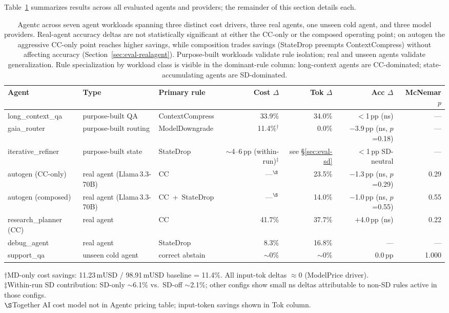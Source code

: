\documentclass[sigconf,9pt]{acmart}
\begin{document}
Table~\ref{tab:summary} summarizes results across all evaluated agents and providers;
the remainder of this section details each.

\begin{table}[t]
\caption{Agentc across seven agent workloads spanning three distinct cost drivers,
three real agents, one unseen cold agent, and three model providers.
Real-agent accuracy deltas are not statistically significant at either the CC-only or
the composed operating point; on autogen the aggressive CC-only point reaches higher
savings, while composition trades savings (StateDrop preempts ContextCompress) without
affecting accuracy (Section~\ref{sec:eval-realagent}).
Purpose-built workloads validate rule isolation;
real and unseen agents validate generalization. Rule specialization by workload class
is visible in the dominant-rule column: long-context agents are CC-dominated;
state-accumulating agents are SD-dominated.}
\label{tab:summary}
\footnotesize
\begin{tabularx}{\textwidth}{@{} l l l r r r r @{}}
\toprule
Agent & Type & Primary rule & Cost $\Delta$ & Tok $\Delta$ & Acc $\Delta$ & McNemar $p$ \\
\midrule
long\_context\_qa   & purpose-built QA      & ContextCompress      & 33.9\% & 34.0\% & $<$1\,pp (ns) & --- \\
gaia\_router        & purpose-built routing & ModelDowngrade       & 11.4\%$^\dagger$ &  0.0\% & $-$3.9\,pp (ns, $p$=0.18) & --- \\
iterative\_refiner  & purpose-built state   & StateDrop            & $\sim$4--6\,pp (within-run)$^\ddagger$ & see \S\ref{sec:eval-sd} & $<$1\,pp SD-neutral & --- \\
\midrule
autogen (CC-only)   & real agent (Llama\,3.3-70B)  & CC            & ---$^\S$ & 23.5\% & $-$1.3\,pp (ns, $p$=0.29) & 0.29 \\
autogen (composed)  & real agent (Llama\,3.3-70B)  & CC~+~StateDrop & ---$^\S$ & 14.0\% & $-$1.0\,pp (ns, $p$=0.55) & 0.55 \\
research\_planner (CC)  & real agent        & CC            & 41.7\% & 37.7\% & $+$4.0\,pp (ns) & 0.22 \\
debug\_agent        & real agent            & StateDrop            &  8.3\% & 16.8\% & --- & --- \\
\midrule
support\_qa         & unseen cold agent     & correct abstain      & $\sim$0\% & $\sim$0\% & 0.0\,pp & 1.000 \\
\bottomrule
\end{tabularx}
\footnotesize{$\dagger$MD-only cost savings: 11.23\,mUSD / 98.91\,mUSD baseline = 11.4\%. All input-tok deltas $\approx$0 (ModelPrice driver).}\\
\footnotesize{$\ddagger$Within-run SD contribution: SD-only $\sim$6.1\% vs.\ SD-off $\sim$2.1\%; other configs show small ns deltas attributable to non-SD rules active in those configs.}\\
\footnotesize{$\S$Together AI cost model not in Agentc pricing table; input-token savings shown in Tok column.}
\end{table}
\end{document}
